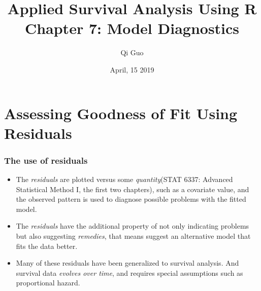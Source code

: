 \documentclass{beamer}
\title[Survival Analysis]{Applied Survival Analysis Using R\\ Chapter 7: Model Diagnostics}
\author[Qi Guo]{Qi Guo}
\institute[UTD]{Department of Mathematical Sciences \\ 
	The University of Texas at Dallas}
\date{April, 15 2019}
\newcommand{\empr}[1]{{\emph{\color{red}#1}}}
\begin{document}
\begin{frame}
  \titlepage
\end{frame}

\bgroup
{}


\section[Outline]{}
\begin{frame}
  \tableofcontents
\end{frame}

\section{Assessing Goodness of Fit Using Residuals}
\begin{frame}
\frametitle{The use of residuals}
\begin{itemize}
\item The \empr{residuals} are plotted versus some \empr{quantity}(STAT 6337: Advanced Statistical Method I, the first two chapters), such as a covariate value, and the observed pattern is used to diagnose possible problems with the fitted model.
\item  The \empr{residuals} have the additional property of not only indicating problems but also suggesting \empr{remedies}, that means suggest an alternative model that fits the data better.
\item Many of these residuals have been generalized to survival analysis. And survival data \empr{evolves over time}, and requires special assumptions such as proportional hazard.
\end{itemize}
\end{frame}
\end{document}

